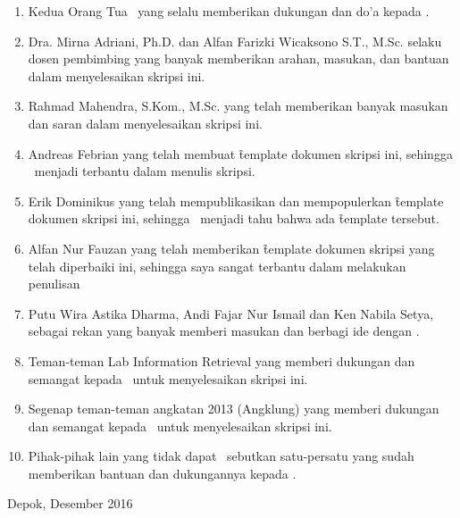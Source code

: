 \begin{enumerate}
	\item Kedua Orang Tua \saya~yang selalu memberikan dukungan dan do'a kepada \saya.
	\item Dra. Mirna Adriani, Ph.D. dan Alfan Farizki Wicaksono S.T., M.Sc. selaku dosen pembimbing yang banyak memberikan arahan, masukan, dan bantuan dalam menyelesaikan skripsi ini.
  \item Rahmad Mahendra, S.Kom., M.Sc. yang telah memberikan banyak masukan dan saran dalam menyelesaikan skripsi ini.
  \item Andreas Febrian yang telah membuat \f{template} dokumen skripsi ini, sehingga \saya~menjadi terbantu dalam menulis skripsi.
  \item Erik Dominikus yang telah mempublikasikan dan mempopulerkan \f{template} dokumen skripsi ini, sehingga \saya~menjadi tahu bahwa ada \f{template} tersebut.
  \item Alfan Nur Fauzan yang telah memberikan \f{template} dokumen skripsi yang telah diperbaiki ini, sehingga saya sangat terbantu dalam melakukan penulisan
	\item Putu Wira Astika Dharma, Andi Fajar Nur Ismail dan Ken Nabila Setya, sebagai rekan yang banyak memberi masukan dan berbagi ide dengan \saya.
  \item Teman-teman Lab Information Retrieval yang memberi dukungan dan semangat kepada \saya~untuk menyelesaikan skripsi ini.
  \item Segenap teman-teman angkatan 2013 (Angklung) yang memberi dukungan dan semangat kepada \saya~untuk menyelesaikan skripsi ini.
	\item Pihak-pihak lain yang tidak dapat \saya~sebutkan satu-persatu yang sudah memberikan bantuan dan dukungannya kepada \saya.
\end{enumerate}
\vspace*{0.1cm}
\begin{flushright}
Depok, Desember 2016\\[0.1cm]
\vspace*{1cm}
\penulis

\end{flushright}